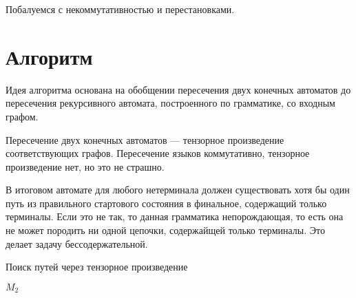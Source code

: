 Побалуемся с некоммутативностью и перестановками.

\section{Алгоритм}

Идея алгоритма основана на обобщении пересечения двух конечных автоматов до пересечения рекурсивного автомата, построенного по грамматике, со входным графом.

Пересечение двух конечных автоматов --- тензорное произведение соответствующих графов.
Пересечение языков коммутативно, тензорное произведение нет, но это не страшно.

В итоговом автомате для любого нетерминала должен существовать хотя бы один путь из правильного стартового состояния в финальное, содержащий только терминалы.
Если это не так, то данная грамматика непорождающая, то есть она не может породить ни одной цепочки, содержайщей только терминалы.
Это делает задачу бессодержательной.

\begin{algorithm}
\begin{algorithmic}[1]
\caption{Поиск путей через тензорное произведение}
\label{lst:algo1}
                    \EndIf
                \EndIf
           \EndFor
        \EndFor
    \EndWhile
\State \Return $M_2$
\EndFunction
\end{algorithmic}
\end{algorithm}


